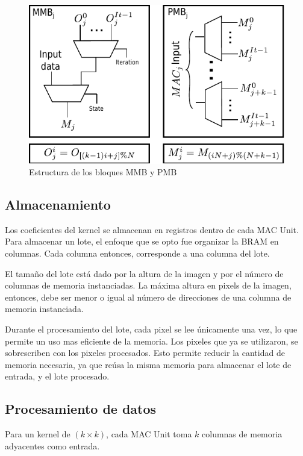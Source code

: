 \bigskip
\bigskip
\begin{figure}
\centering
\includegraphics{muxes_cont}
\caption{ Estructura de los bloques MMB y PMB}
\label{mmu_structure}
\end{figure}
\subsection{Almacenamiento}\label{storage_subsecc}
Los coeficientes del kernel se almacenan en registros dentro de cada MAC Unit.
Para almacenar un lote, el enfoque que se opto fue organizar la BRAM en
columnas. Cada columna entonces, corresponde a una columna del lote.

El tamaño del lote está dado por la altura de la imagen y por el número de
columnas de memoria instanciadas.  La máxima altura en pixels de la imagen,
entonces, debe ser menor o igual al número de direcciones de una columna de
memoria instanciada.

Durante el procesamiento del lote, cada pixel se lee únicamente una vez, lo que permite un uso mas eficiente de la memoria. Los pixeles que ya se utilizaron, se sobrescriben con los pixeles procesados. 
Esto permite reducir la cantidad de memoria necesaria, ya que reúsa la misma memoria para almacenar el lote de entrada, y el lote procesado.

\subsection{Procesamiento de datos}  \label{processing_subsecc}
Para un kernel de  $(k \times k)$, cada MAC Unit toma $k$ columnas de memoria
adyacentes como entrada.

